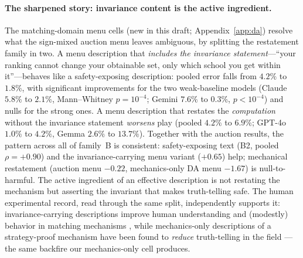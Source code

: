 \paragraph{The sharpened story: invariance content is the active ingredient.}
The matching-domain menu cells (new in this draft; Appendix~\ref{app:da})
resolve what the sign-mixed auction menu leaves ambiguous, by splitting the
restatement family in two. A menu description that \emph{includes the
invariance statement}---``your ranking cannot change your obtainable set,
only which school you get within it''---behaves like a safety-exposing
description: pooled error falls from $4.2\%$ to $1.8\%$, with significant
improvements for the two weak-baseline models (Claude $5.8\%$ to $2.1\%$,
Mann--Whitney $p = 10^{-4}$; Gemini $7.6\%$ to $0.3\%$, $p < 10^{-4}$) and
nulls for the strong ones. A menu description that restates the
\emph{computation} without the invariance statement \emph{worsens} play
(pooled $4.2\%$ to $6.9\%$; GPT-4o $1.0\%$ to $4.2\%$, Gemma $2.6\%$ to
$13.7\%$). Together with the auction results, the pattern across all of
family~B is consistent: safety-exposing text (B2, pooled $\rho = +0.90$) and
the invariance-carrying menu variant ($+0.65$) help; mechanical restatement
(auction menu $-0.22$, mechanics-only DA menu $-1.67$) is null-to-harmful.
The active ingredient of an effective description is not restating the
mechanism but asserting the invariant that makes truth-telling safe. The
human experimental record, read through the same split, independently
supports it: invariance-carrying descriptions improve human understanding
and (modestly) behavior in matching mechanisms
\citep{gonczarowski2024describing,katuscak2024simpler}, while
mechanics-only descriptions of a strategy-proof mechanism have been found
to \emph{reduce} truth-telling in the field \citep{guillen2018effectiveness}
---the same backfire our mechanics-only cell produces.

